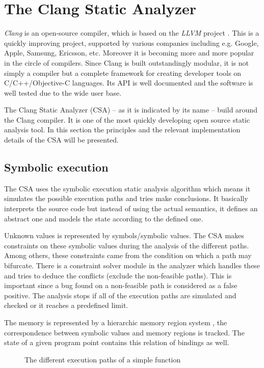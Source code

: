 \section{The Clang Static Analyzer}

\emph{Clang} is an open-source compiler, which is based on the \emph{LLVM} 
project \cite{lattner:clang}. This is a quickly improving project, 
supported by various companies including e.g. Google, Apple, Samsung, Ericsson, 
etc. Moreover it is becoming more and more popular in the circle of compilers. 
Since Clang is built outstandingly modular, it is not simply a compiler but a 
complete framework for creating developer tools on C/C++/Objective-C 
languages. Its API is well documented and the software is well tested due to 
the wide user base.


The Clang Static Analyzer (CSA) -- as it is indicated by its name -- build 
around the Clang compiler. It is one of the most quickly developing open source 
static analysis tool. In this section the principles and the relevant 
implementation details of the CSA will be presented.
\subsection{Symbolic execution}
The CSA uses the symbolic execution static analysis algorithm which means it 
simulates the possible execution paths and tries make conclusions. It basically 
interprets the source code but instead of using the actual semantics, it 
defines an abstract one and models the state according to the defined one.

Unknown values is represented by symbols/symbolic values. The CSA makes 
constraints on these symbolic values during the analysis of the different 
paths. Among others, these constraints came from the condition on which a path 
may bifurcate. There is a constraint solver module in the analyzer which 
handles these and tries to deduce the conflicts (exclude the non-feasible 
paths). This is important since a bug found on a non-feasible path is 
considered as a false positive. The analysis stops if all of the execution 
paths are simulated and checked or it reaches a predefined limit.

The memory is represented by a hierarchic memory region system 
\cite{clang:memmodel}, the correspondence between symbolic values and memory 
regions is tracked. The state of a given program point contains this relation 
of bindings as well.

\begin{figure}[h]
	\centering
	\caption{The different execution paths of a simple function}
	\label{fig:exec_path}
\end{figure}

